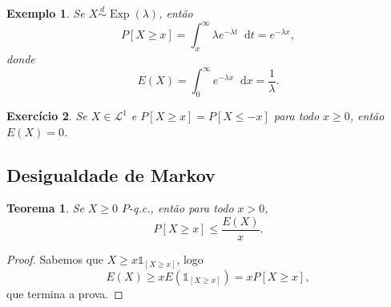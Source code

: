 \documentclass[reqno]{article}
\newcommand*\1{\mathds{1}}
\newtheorem{theorem}{Teorema}[section]
\DeclareMathOperator{\Exp}{Exp}
\newtheorem{example}{Exemplo}[section]
\newtheorem{exercise}[example]{Exercício}
\renewcommand*\d{\mathop{}\!\mathrm{d}}
\begin{document}
\begin{example}
  Se $X \overset{d}\sim \Exp(\lambda)$, então
  \begin{equation}
    P[X \geq x] = \int_x^\infty \lambda e^{-\lambda t} \d t = e^{-\lambda x},
  \end{equation}
  donde
  \begin{equation}
    E(X) = \int_0^\infty e^{-\lambda x} \d x = \frac{1}{\lambda}.
  \end{equation}
\end{example}

\begin{exercise}
  Se $X \in \mathcal{L}^1$ e $P[X \geq x] = P[X \leq -x]$ para todo $x \geq 0$, então $E(X) = 0$.
\end{exercise}

\subsection{Desigualdade de Markov}

\begin{theorem}
  Se $X \geq 0$ $P$-q.c., então para todo $x > 0$,
  \begin{equation}
    P[X \geq x] \leq \frac{E(X)}{x}.
  \end{equation}
\end{theorem}

\begin{proof}
  Sabemos que $X \geq x \1_{[X \geq x]}$, logo
  \begin{equation}
    E(X) \geq x E(\1_{[X \geq x]}) = x P[X \geq x],
  \end{equation}
  que termina a prova.
\end{proof}
\end{document}

